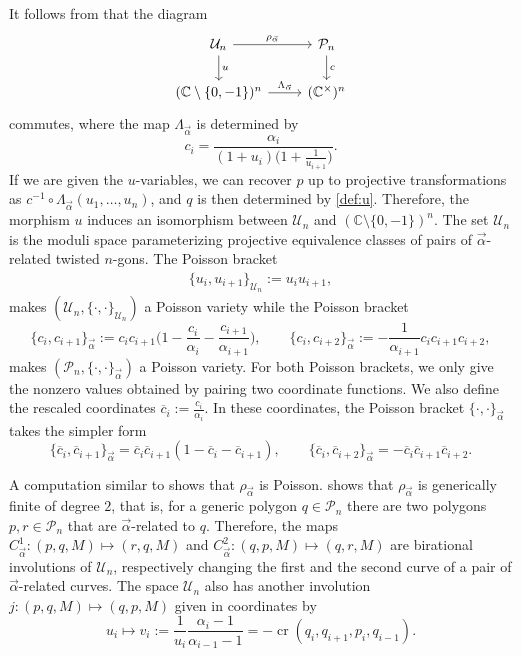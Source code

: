 \documentclass[pdftex]{sigma}
\numberwithin{equation}{section}
\newcommand{\C}{{\mathbb C}}
\newcommand{\be}{\begin{equation}}
\newcommand{\ee}{\end{equation}}
\newcommand{\la}{\label}
\def\cro{\operatorname{cr}}
\begin{document}
	
	It follows from \cite[Section 4.8]{AFIT} that the diagram
	\[
	\begin{tikzcd}
		\mathcal U_n \arrow[r, "\rho_{\vec \alpha}"] \arrow[d, "u"]
		& \mathcal P_n \arrow[d, "c"] \\
		(\C\setminus\{0,-1\})^n \arrow[r,"\Lambda_{\vec{\alpha}}"]
		& (\C^\times)^n
	\end{tikzcd}
	\]
	commutes, where the map $\Lambda_{\vec{\alpha}}$ is determined by
	\[
		c_i = \frac{\alpha_i}{(1+u_i)\big(1+\frac 1 {u_{i+1}}\big)}.
	\]
	If we are given the $u$-variables, we can recover $p$ up to projective transformations as $c^{-1} \circ \Lambda_{\vec \alpha}(u_1,\dots,u_n)$, and $q$ is then determined by \eqref{def:u}. Therefore, the morphism $u$ induces an isomorphism between $\mathcal U_n$ and $(\C \setminus \{0,-1\})^n$. The set $\mathcal U_n$ is the moduli space parameterizing projective equivalence classes of pairs of $\vec \alpha$-related twisted $n$-gons. The Poisson bracket
	\begin{align}
		\{u_i,u_{i+1}\}_{\mathcal U_n}:=u_i u_{i+1}, \label{eq:upoisson}
	\end{align}
	makes $(\mathcal U_n,\{\cdot, \cdot\}_{\mathcal U_n})$ a Poisson variety while the Poisson bracket
	\[
	\{c_i,c_{i+1}\}_{\vec \alpha} := c_i c_{i+1} \biggl(1-\frac{c_i}{\alpha_i}-\frac{c_{i+1}}{\alpha_{i+1}}\biggr), \qquad
	\{c_i,c_{i+2}\}_{\vec{\alpha}} := -\frac{1}{\alpha_{i+1}}c_i c_{i+1} c_{i+2},
	\]
	makes $(\mathcal P_n,\{\cdot,\cdot\}_{\vec{\alpha}})$ a Poisson variety. For both Poisson brackets, we only give the nonzero values obtained by pairing two coordinate functions. We also define the rescaled coordinates $\overline{c}_i:=\frac{c_i}{\alpha_i}$. In these coordinates, the Poisson bracket $\{\cdot,\cdot\}_{\vec \alpha}$ takes the simpler form
	\[
	\{\overline c_i, \overline c_{i+1}\}_{\vec \alpha} = \overline c_i \overline c_{i+1} \left(1-\overline{c}_i-\overline{c}_{i+1}\right), \qquad
	\{\overline c_i,\overline c_{i+2}\}_{\vec \alpha} = -\overline c_i \overline c_{i+1} \overline c_{i+2}.
	\]
	
	
	A computation similar to \cite[Lemma 4.9]{AFIT} shows that $\rho_{\vec \alpha}$ is Poisson. \cite[Corollary 2.7]{AFIT} shows that $\rho_{\vec \alpha}$ is generically finite of degree $2$, that is, for a generic polygon $q \in \mathcal P_n$ there are two polygons $p,r \in \mathcal P_n$ that are ${\vec \alpha}$-related to $q$. Therefore, the maps $C^1_{\vec \alpha}\colon (p,q,M) \mapsto (r,q,M)$ and $C^2_{\vec \alpha}\colon (q,p,M) \mapsto (q,r,M)$ are birational involutions of $\mathcal U_n$, respectively changing the first and the second curve of a pair of $\vec \alpha$-related curves. The space $\mathcal U_n$ also has another involution $j\colon (p,q,M) \mapsto (q,p,M)$ given in coordinates by
\be \la{eq:uv}
	u_i \mapsto v_i:= \frac{1}{u_i} \frac{\alpha_i-1}{\alpha_{i-1}-1}= -\cro(q_i,q_{i+1},p_i,q_{i-1}).
\ee
	
\end{document}
